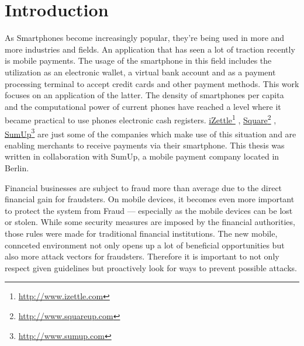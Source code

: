 \documentclass[a4paper, oneside]{csthesis}
\newcommand\fnurl[2]{%
  \href{#2}{#1}\footnote{\url{#2}}%
}
\begin{document}
\tableofcontents

\mainmatter %



\chapter{Introduction}

As Smartphones become increasingly popular, they're being used in more and more industries and fields. An application that has seen a lot of traction recently is mobile payments. The usage of the smartphone in this field includes the utilization as an electronic wallet, a virtual bank account and as a payment processing terminal to accept credit cards and other payment methods.
This work focuses on an application of the latter.
The density of smartphones per capita and the computational power of current phones have reached a level where it became practical to use phones electronic cash registers.
\fnurl{iZettle}{http://www.izettle.com}, \fnurl{Square}{http://www.squareup.com}, \fnurl{SumUp}{http://www.sumup.com} are just some of the companies which make use of this situation and are enabling merchants to receive payments via their smartphone. This thesis was written in collaboration with SumUp, a mobile payment company located in Berlin.


Financial businesses are subject to fraud more than average due to the direct financial gain for fraudsters. On mobile devices, it becomes even more important to protect the system from Fraud --- especially as the mobile devices can be lost or stolen. While some security measures are imposed by the financial authorities, those rules were made for traditional financial institutions. The new mobile, connceted environment not only opens up a lot of beneficial opportunities but also more attack vectors for fraudsters. Therefore it is important to not only respect given guidelines but proactively look for ways to prevent possible attacks.
\end{document}
